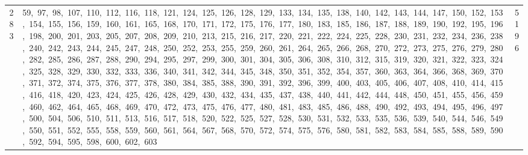 \begin{longtable}{c|p{}|r}
283 & 59,\ 97,\ 98,\ 107,\ 110,\ 112,\ 116,\ 118,\ 121,\ 124,\ 125,\ 126,\ 128,\ 129,\ 133,\ 134,\ 135,\ 138,\ 140,\ 142,\ 143,\ 144,\ 147,\ 150,\ 152,\ 153,\ 154,\ 155,\ 156,\ 159,\ 160,\ 161,\ 165,\ 168,\ 170,\ 171,\ 172,\ 175,\ 176,\ 177,\ 180,\ 183,\ 185,\ 186,\ 187,\ 188,\ 189,\ 190,\ 192,\ 195,\ 196,\ 198,\ 200,\ 201,\ 203,\ 205,\ 207,\ 208,\ 209,\ 210,\ 213,\ 215,\ 216,\ 217,\ 220,\ 221,\ 222,\ 224,\ 225,\ 228,\ 230,\ 231,\ 232,\ 234,\ 236,\ 238,\ 240,\ 242,\ 243,\ 244,\ 245,\ 247,\ 248,\ 250,\ 252,\ 253,\ 255,\ 259,\ 260,\ 261,\ 264,\ 265,\ 266,\ 268,\ 270,\ 272,\ 273,\ 275,\ 276,\ 279,\ 280,\ 282,\ 285,\ 286,\ 287,\ 288,\ 290,\ 294,\ 295,\ 297,\ 299,\ 300,\ 301,\ 304,\ 305,\ 306,\ 308,\ 310,\ 312,\ 315,\ 319,\ 320,\ 321,\ 322,\ 323,\ 324,\ 325,\ 328,\ 329,\ 330,\ 332,\ 333,\ 336,\ 340,\ 341,\ 342,\ 344,\ 345,\ 348,\ 350,\ 351,\ 352,\ 354,\ 357,\ 360,\ 363,\ 364,\ 366,\ 368,\ 369,\ 370,\ 371,\ 372,\ 374,\ 375,\ 376,\ 377,\ 378,\ 380,\ 384,\ 385,\ 388,\ 390,\ 391,\ 392,\ 396,\ 399,\ 400,\ 403,\ 405,\ 406,\ 407,\ 408,\ 410,\ 414,\ 415,\ 416,\ 418,\ 420,\ 423,\ 424,\ 425,\ 426,\ 428,\ 429,\ 430,\ 432,\ 434,\ 435,\ 437,\ 438,\ 440,\ 441,\ 442,\ 444,\ 448,\ 450,\ 451,\ 455,\ 456,\ 459,\ 460,\ 462,\ 464,\ 465,\ 468,\ 469,\ 470,\ 472,\ 473,\ 475,\ 476,\ 477,\ 480,\ 481,\ 483,\ 485,\ 486,\ 488,\ 490,\ 492,\ 493,\ 494,\ 495,\ 496,\ 497,\ 500,\ 504,\ 506,\ 510,\ 511,\ 513,\ 516,\ 517,\ 518,\ 520,\ 522,\ 525,\ 527,\ 528,\ 530,\ 531,\ 532,\ 533,\ 535,\ 536,\ 539,\ 540,\ 544,\ 546,\ 549,\ 550,\ 551,\ 552,\ 555,\ 558,\ 559,\ 560,\ 561,\ 564,\ 567,\ 568,\ 570,\ 572,\ 574,\ 575,\ 576,\ 580,\ 581,\ 582,\ 583,\ 584,\ 585,\ 588,\ 589,\ 590,\ 592,\ 594,\ 595,\ 598,\ 600,\ 602,\ 603 & 5196 \\

\end{longtable}
